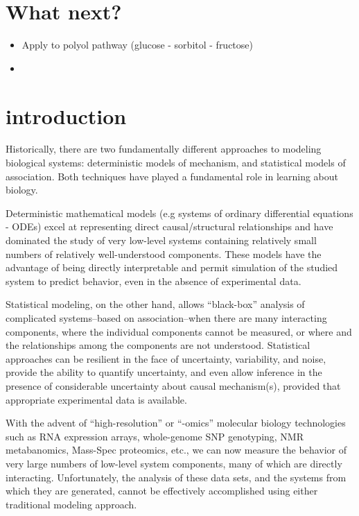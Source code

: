\documentclass{beamer}
\begin{document}
\section{What next?}

\begin{itemize}
\item Apply to polyol pathway (glucose - sorbitol - fructose)
\item 
\end{itemize}

\appendix

\section{introduction}

Historically, there are two fundamentally different approaches to
modeling biological systems: deterministic models of mechanism, and
statistical models of association. Both techniques have played a
fundamental role in learning about biology.
  
  Deterministic mathematical models (e.g systems of ordinary
  differential equations - ODEs) excel at representing direct
  causal/structural relationships and have dominated the study of
  very low-level systems containing relatively small numbers of
  relatively well-understood components.  These models have the
  advantage of being directly interpretable and permit simulation of
  the studied system to predict behavior, even in the absence of
  experimental data.
  
  Statistical modeling, on the other hand, allows ``black-box''
  analysis of complicated systems--based on association--when there are
  many interacting components, where the individual components cannot
  be measured, or where and the relationships among the components are
  not understood.  Statistical approaches can be resilient in the face
  of uncertainty, variability, and noise, provide the ability to
  quantify uncertainty, and even allow inference in the presence of
  considerable uncertainty about causal mechanism(s), provided that
  appropriate experimental data is available.
  
  With the advent of ``high-resolution'' or ``-omics'' molecular
  biology technologies such as RNA expression arrays, whole-genome SNP
  genotyping, NMR metabanomics, Mass-Spec proteomics, etc., we can now
  measure the behavior of very large numbers of low-level system
  components, many of which are directly interacting. Unfortunately,
  the analysis of these data sets, and the systems from which they are
  generated, cannot be effectively accomplished using either
  traditional modeling approach.
  
\end{document}
